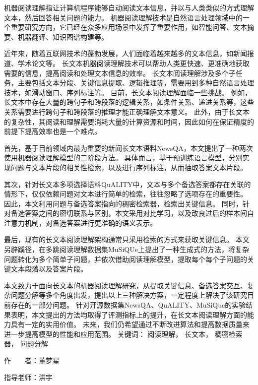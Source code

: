 
\begin{cabstract}
    机器阅读理解指让计算机程序能够自动阅读文本信息，并以与人类类似的方式理解文本，然后回答相关问题的能力。
    机器阅读理解技术是自然语言处理领域中的一个重要研究方向，它已经在众多应用场景中发挥了重要作用，如智能问答、文本摘要、机器翻译、知识图谱构建等。

    近年来，随着互联网技术的蓬勃发展，人们面临着越来越多的文本信息，如新闻报道、学术论文等。
    长文本机器阅读理解技术可以帮助人类更快速、更准确地获取需要的信息，提高阅读和处理文本信息的效率。
    长文本阅读理解涉及多个子任务，主要包括文本分段、关键信息提取、逻辑推理等，需要用到多种自然语言处理技术，如滑动窗口、序列标注等。
    目前，长文本阅读理解面临一些挑战。
    例如，长文本中存在大量的跨句子和跨段落的逻辑关系，如条件关系、递进关系等，这些关系需要进行跨句子和跨段落的推理才能正确理解文本意义。
    此外，由于长文本的复杂性，其阅读和理解需要消耗大量的计算资源和时间，因此如何在保证精度的前提下提高效率也是一个难点。

    首先，基于目前领域内最为重要的新闻长文本语料NewsQA，本文提出了一种两次使用机器阅读理解模型的二阶段方法。
    具体而言，基于预训练语言模型，分别实现问题与文本片段的相关性检索，以及进行序列标注，从而抽取答案文本片段。

    其次，针对长文本多项选择语料QuALITY中，文本与多个备选答案都存在关联的情形下，仅仅依赖问题对文本进行简单的检索，往往忽略了选项存在的重要性。
    因此，本文利用问题与备选答案指向的稠密检索器，检索出关键信息。
    同时，针对备选答案之间的密切联系与区别，本文采用对比学习，以及改良过后的样本间自注意力机制，对备选答案进行更准确的语义表示。

    最后，现有的长文本阅读理解架构通常只采用检索的方式来获取关键信息。
    本文另辟蹊径，在多跳阅读理解数据集MuSiQUe上提出了一种生成式的方法，将复杂问题转化为多个简单子问题，并依次借助阅读理解模型，提取每个每个子问题的关键文本段落以及答案片段。

    本文致力于面向长文本的机器阅读理解研究，从提取关键信息、备选答案交互、复杂问题分解等多个角度出发，提出以上三种解决方案，一定程度上解决了该研究目前存在的一部分问题。
    针对开源数据集NewsQA、QuALITY、MuSiQue的实验结果表明，本文提出的方法均取得了评测指标上的提升，在长文本阅读理解方面的能力具有一定的实用价值。
    未来，我们仍希望通过不断改进算法和提高数据质量来进一步提高模型的性能和应用范围。	
	\vskip 21bp
	{\heiti{} 关键词：}
	阅读理解，
	长文本，
	稠密检索器，
	问题分解
	\begin{flushright}
		作~~~~者：董梦星
		
		指导老师：洪宇
		
	\end{flushright}
\end{cabstract}


